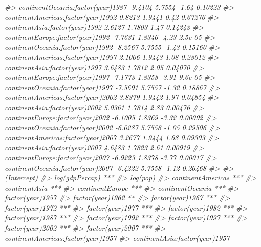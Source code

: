 \documentclass[]{book}
\newenvironment{Shaded}{\begin{snugshade}}{\end{snugshade}}
\newcommand{\CommentTok}[1]{\textcolor[rgb]{0.56,0.35,0.01}{\textit{#1}}}
\begin{document}
\begin{Shaded}
\begin{Highlighting}[]
\CommentTok{#> continentOceania:factor(year)1987   -9.4104     5.7554   -1.64  0.10223}
\CommentTok{#> continentAmericas:factor(year)1992   0.8213     1.9441    0.42  0.67276}
\CommentTok{#> continentAsia:factor(year)1992       2.6127     1.7803    1.47  0.14243}
\CommentTok{#> continentEurope:factor(year)1992    -7.7631     1.8346   -4.23  2.5e-05}
\CommentTok{#> continentOceania:factor(year)1992   -8.2567     5.7555   -1.43  0.15160}
\CommentTok{#> continentAmericas:factor(year)1997   2.1006     1.9443    1.08  0.28012}
\CommentTok{#> continentAsia:factor(year)1997       3.6483     1.7812    2.05  0.04070}
\CommentTok{#> continentEurope:factor(year)1997    -7.1773     1.8358   -3.91  9.6e-05}
\CommentTok{#> continentOceania:factor(year)1997   -7.5691     5.7557   -1.32  0.18867}
\CommentTok{#> continentAmericas:factor(year)2002   3.8379     1.9442    1.97  0.04854}
\CommentTok{#> continentAsia:factor(year)2002       5.0361     1.7814    2.83  0.00476}
\CommentTok{#> continentEurope:factor(year)2002    -6.1005     1.8369   -3.32  0.00092}
\CommentTok{#> continentOceania:factor(year)2002   -6.0287     5.7558   -1.05  0.29506}
\CommentTok{#> continentAmericas:factor(year)2007   3.2677     1.9444    1.68  0.09303}
\CommentTok{#> continentAsia:factor(year)2007       4.6483     1.7823    2.61  0.00919}
\CommentTok{#> continentEurope:factor(year)2007    -6.9223     1.8378   -3.77  0.00017}
\CommentTok{#> continentOceania:factor(year)2007   -6.4222     5.7558   -1.12  0.26468}
\CommentTok{#>                                       }
\CommentTok{#> (Intercept)                           }
\CommentTok{#> log(gdpPercap)                     ***}
\CommentTok{#> log(pop)                              }
\CommentTok{#> continentAmericas                  ***}
\CommentTok{#> continentAsia                      ***}
\CommentTok{#> continentEurope                    ***}
\CommentTok{#> continentOceania                   ***}
\CommentTok{#> factor(year)1957                      }
\CommentTok{#> factor(year)1962                   ** }
\CommentTok{#> factor(year)1967                   ***}
\CommentTok{#> factor(year)1972                   ***}
\CommentTok{#> factor(year)1977                   ***}
\CommentTok{#> factor(year)1982                   ***}
\CommentTok{#> factor(year)1987                   ***}
\CommentTok{#> factor(year)1992                   ***}
\CommentTok{#> factor(year)1997                   ***}
\CommentTok{#> factor(year)2002                   ***}
\CommentTok{#> factor(year)2007                   ***}
\CommentTok{#> continentAmericas:factor(year)1957    }
\CommentTok{#> continentAsia:factor(year)1957        }

\end{Highlighting}
\end{Shaded}
\end{document}
